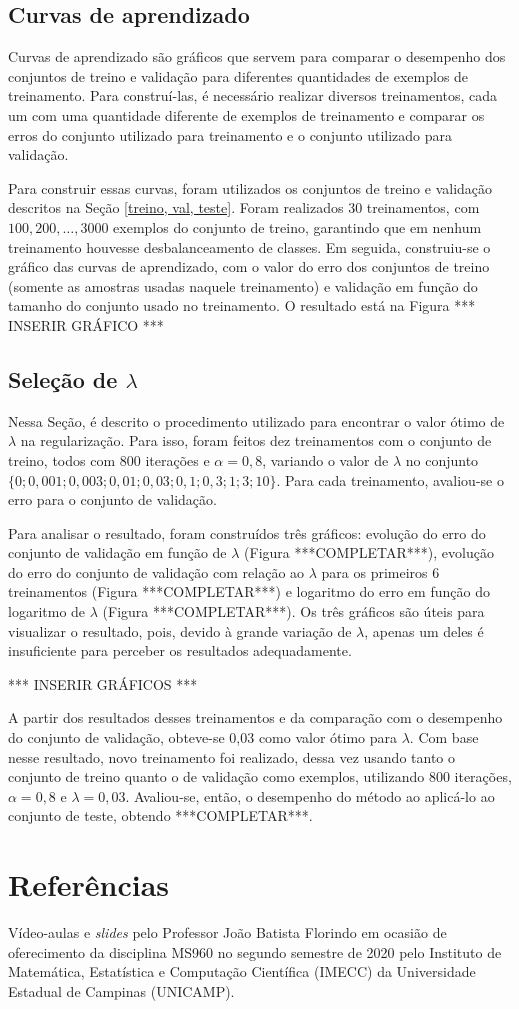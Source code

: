 \documentclass[12pt]{article}
\begin{document}
\subsection{Curvas de aprendizado}
Curvas de aprendizado são gráficos que servem para comparar o desempenho dos conjuntos de treino e validação para diferentes quantidades de exemplos de treinamento. Para construí-las, é necessário realizar diversos treinamentos, cada um com uma quantidade diferente de exemplos de treinamento e comparar os erros do conjunto utilizado para treinamento e o conjunto utilizado para validação.

Para construir essas curvas, foram utilizados os conjuntos de treino e validação descritos na Seção \ref{treino, val, teste}. Foram realizados 30 treinamentos, com $100, 200, \ldots, 3000$ exemplos do conjunto de treino, garantindo que em nenhum treinamento houvesse desbalanceamento de classes. Em seguida, construiu-se o gráfico das curvas de aprendizado, com o valor do erro dos conjuntos de treino (somente as amostras usadas naquele treinamento) e validação em função do tamanho do conjunto usado no treinamento. O resultado está na Figura *** INSERIR GRÁFICO ***

\subsection{Seleção de $\lambda$} \label{lambda_otimo}
Nessa Seção, é descrito o procedimento utilizado para encontrar o valor ótimo de $\lambda$ na regularização. Para isso, foram feitos dez treinamentos com o conjunto de treino, todos com 800 iterações e $\alpha=0,8$, variando o valor de $\lambda$ no conjunto $\{0; 0,001; 0,003; 0,01; 0,03; 0,1; 0,3; 1; 3; 10\}$. Para cada treinamento, avaliou-se o erro para o conjunto de validação.

Para analisar o resultado, foram construídos três gráficos:  evolução do erro do conjunto de validação em função de $\lambda$ (Figura ***COMPLETAR***),  evolução do erro do conjunto de validação com relação ao $\lambda$ para os primeiros 6 treinamentos (Figura ***COMPLETAR***) e logaritmo do erro em função do logaritmo de $\lambda$ (Figura ***COMPLETAR***). Os três gráficos são úteis para visualizar o resultado, pois, devido à grande variação de $\lambda$, apenas um deles é insuficiente para perceber os resultados adequadamente.

*** INSERIR GRÁFICOS ***

A partir dos resultados desses treinamentos e da comparação com o desempenho do conjunto de validação, obteve-se 0,03 como valor ótimo para $\lambda$. Com base nesse resultado, novo treinamento foi realizado, dessa vez usando tanto o conjunto de treino quanto o de validação como exemplos, utilizando 800 iterações, $\alpha=0,8$ e $\lambda=0,03$. Avaliou-se, então, o desempenho do método ao aplicá-lo ao conjunto de teste, obtendo ***COMPLETAR***.


\section{Referências}
Vídeo-aulas e \textit{slides} pelo Professor João Batista Florindo em ocasião de oferecimento da disciplina MS960 no segundo semestre de 2020 pelo Instituto de Matemática, Estatística e Computação Científica (IMECC) da Universidade Estadual de Campinas (UNICAMP).
\end{document}
